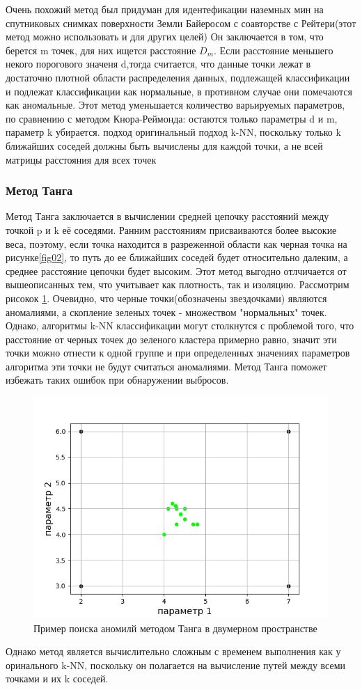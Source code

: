   Очень похожий метод был придуман для идентефикации  наземных мин  на спутниковых снимках поверхности Земли Байеросом с соавторстве с Рейтери\cite{Book10}(этот метод можно использовать и для других целей) Он заключается в том, что берется m точек, для них ищется расстояние $D_m$. Если расстояние меньшего некого порогового значеня d,тогда  считается, что  данные точки лежат в достаточно плотной области распределения данных, подлежащей классификации и подлежат классификации как нормальные, в противном случае они помечаются как аномальные. Этот метод уменьшается количество варьируемых параметров, по сравнению с методом Кнора-Реймонда: остаются только параметры d и m, параметр k убирается. 
  подход оригинальный подход k-NN, поскольку только k ближайших соседей должны быть вычислены для каждой точки, а не всей матрицы расстояния
  для всех точек
\subsubsection{Метод Танга}
Метод Танга заключается  в вычислении средней цепочку расстояний между точкой p и k её соседями. Ранним расстояниям присваиваются более высокие веса, поэтому, если точка находится в разреженной
области как черная точка на рисунке\ref{fig02}, то путь до  ее ближайших соседей  будет относительно далеким, а среднее расстояние цепочки
будет высоким. Этот метод выгодно отлчичается от вышеописанных тем, что учитывает как  плотность, так и изоляцию. Рассмотрим рисокок \ref{fig03}.
Очевидно, что черные точки(обозначены звездочками) являются аномалиями, а скопление зеленых точек - множеством "нормальных" точек. Однако, алгоритмы k-NN классификации могут столкнутся с проблемой того, что расстояние от черных точек до зеленого кластера примерно равно, значит эти точки можно отнести к одной группе и при определенных значениях параметров алгоритма эти точки не будут считаться аномалиями. Метод Танга поможет избежать таких ошибок при обнаружении выбросов.
\begin{figure}
	\centering
	\includegraphics[width=.5\textwidth]{img/3.png}
	\caption{Пример поиска аномилй методом Танга в двумерном пространстве}
	\label{fig03}
\end{figure}
 Однако метод является вычислительно сложным с временем выполнения как у оринального k-NN, поскольку он полагается на вычисление путей между всеми точками и их k соседей.
